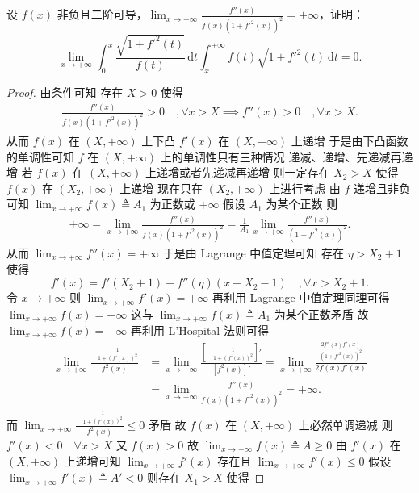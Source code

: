 \documentclass[../../main.tex]{subfiles}%
\begin{document}
\begin{example}
设 \( f(x) \) 非负且二阶可导，\( \lim_{x \to +\infty} \frac{f''(x)}{f(x)(1 + f'^2(x))^2} = +\infty \)，证明：
\[
\lim_{x \to +\infty} \int_0^x \frac{\sqrt{1 + f'^2(t)}}{f(t)} \, \mathrm{d}t \int_x^{+\infty} f(t) \sqrt{1 + f'^2(t)} \, \mathrm{d}t = 0.
\] 
\end{example}
\begin{proof}

由条件可知 存在 \( X > 0 \) 使得
\begin{align*}
\frac{f''(x)}{f(x)(1 + f'^2(x))^2} > 0 \quad ,\forall x > X \implies f''(x) > 0 \quad ,\forall x > X.
\end{align*}
从而 \( f(x) \) 在 \( (X, +\infty) \) 上下凸 \( f'(x) \) 在 \( (X, +\infty) \) 上递增 于是由下凸函数的单调性可知 \( f \) 在 \( (X, +\infty) \) 上的单调性只有三种情况 递减、递增、先递减再递增 若 \( f(x) \) 在 \( (X, +\infty) \) 上递增或者先递减再递增 则一定存在 \( X_2 > X \) 使得 \( f(x) \) 在 \( (X_2, +\infty) \) 上递增 现在只在 \( (X_2, +\infty) \) 上进行考虑 由 \( f \) 递增且非负可知 \( \lim_{x \to +\infty} f(x) \triangleq A_1 \) 为正数或 \( +\infty \) 假设 \( A_1 \) 为某个正数 则
\begin{align*}
+\infty = \lim_{x \to +\infty} \frac{f''(x)}{f(x)(1 + f'^2(x))^2} = \frac{1}{A_1} \lim_{x \to +\infty} \frac{f''(x)}{(1 + f'^2(x))^2}.
\end{align*}
从而 \( \lim_{x \to +\infty} f''(x) = +\infty \) 于是由 Lagrange 中值定理可知 存在 \( \eta > X_2 + 1 \) 使得
\[
f'(x) = f'(X_2 + 1) + f''(\eta)(x - X_2 - 1) \quad, \forall x > X_2 + 1.
\]
令 \( x \to +\infty \) 则 \( \lim_{x \to +\infty} f'(x) = +\infty \) 再利用 Lagrange 中值定理同理可得 \( \lim_{x \to +\infty} f(x) = +\infty \) 这与 \( \lim_{x \to +\infty} f(x) \triangleq A_1 \) 为某个正数矛盾 故 \( \lim_{x \to +\infty} f(x) = +\infty \) 再利用 L’Hospital 法则可得
\begin{align*}
\lim_{x \to +\infty} \frac{-\frac{1}{1 + (f'(x))^2}}{f^2(x)} &= \lim_{x \to +\infty} \frac{\left[ -\frac{1}{1 + (f'(x))^2} \right]'}{\left[ f^2(x) \right]'} = \lim_{x \to +\infty} \frac{\frac{2f''(x)f'(x)}{(1 + f'^2(x))^2}}{2f(x)f'(x)} \\
&= \lim_{x \to +\infty} \frac{f''(x)}{f(x)(1 + f'^2(x))^2} = +\infty.
\end{align*}
而 \( \lim_{x \to +\infty} \frac{-\frac{1}{1 + (f'(x))^2}}{f^2(x)} \leqslant 0 \) 矛盾 故 \( f(x) \) 在 \( (X, +\infty) \) 上必然单调递减 则 \( f'(x) < 0 \quad \forall x > X \) 又 \( f(x) > 0 \) 故 \( \lim_{x \to +\infty} f(x) \triangleq A \geqslant 0 \) 由 \( f'(x) \) 在 \( (X, +\infty) \) 上递增可知 \( \lim_{x \to +\infty} f'(x) \) 存在且 \( \lim_{x \to +\infty} f'(x) \leqslant 0 \) 假设 \( \lim_{x \to +\infty} f'(x) \triangleq A' < 0 \) 则存在 \( X_1 > X \) 使得

\end{proof}
\end{document}
